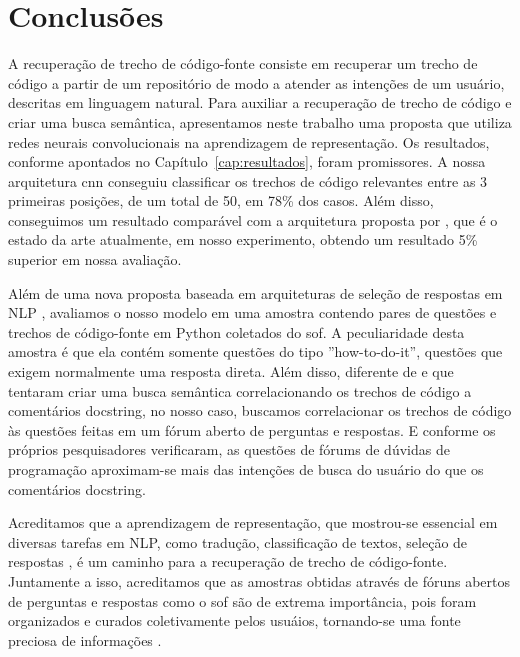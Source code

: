 \chapter{Conclusões}
\label{cap:conclusoes}


A recuperação de trecho de código-fonte consiste em recuperar um trecho de código a partir de um repositório de modo a atender as intenções de um usuário, descritas em linguagem natural. Para auxiliar a recuperação de trecho de código e criar uma busca semântica, apresentamos neste trabalho uma proposta que utiliza redes neurais convolucionais na aprendizagem de representação. Os resultados, conforme apontados no Capítulo~\ref{cap:resultados}, foram promissores. A nossa arquitetura \acrshort{cnn} conseguiu classificar os trechos de código relevantes entre as 3 primeiras posições, de um total de 50, em 78\% dos casos. Além disso, conseguimos um resultado comparável com a arquitetura proposta por \cite{cambronero-deep-learning-code-search:2019}, que é o estado da arte atualmente, em nosso experimento, obtendo um resultado 5\% superior em nossa avaliação.

Além de uma nova proposta baseada em arquiteturas de seleção de respostas em NLP \citep{feng-2015, tan-lstm-qa}, avaliamos o nosso modelo em uma amostra contendo pares de questões e trechos de código-fonte em Python coletados do \Gls{sof}. A peculiaridade desta amostra é que ela contém somente questões do tipo ''how-to-do-it'', questões que exigem normalmente uma resposta direta. Além disso, diferente de \cite{cambronero-deep-learning-code-search:2019} e \cite{husain-github-semantic-search-code-2019} que tentaram criar uma busca semântica correlacionando os trechos de código a comentários \gls{docstring}, no nosso caso, buscamos correlacionar os trechos de código às questões feitas em um fórum aberto de perguntas e respostas. E conforme os próprios pesquisadores \cite{cambronero-deep-learning-code-search:2019, husain-github-semantic-search-code-2019} verificaram, as questões de fórums de dúvidas de programação aproximam-se mais das intenções de busca do usuário do que os comentários docstring. 

Acreditamos que a aprendizagem de representação, que mostrou-se essencial em diversas tarefas em NLP, como tradução, classificação de textos, seleção de respostas \citep{devlin-etal-2019-bert, yang2019xlNet}, é um caminho para a recuperação de trecho de código-fonte. Juntamente a isso, acreditamos que as amostras obtidas através de fóruns abertos de perguntas e respostas como o \Gls{sof} são de extrema importância, pois foram organizados e curados coletivamente pelos usuáios, tornando-se uma fonte preciosa de informações \citep{Wang-quora:2013}.

